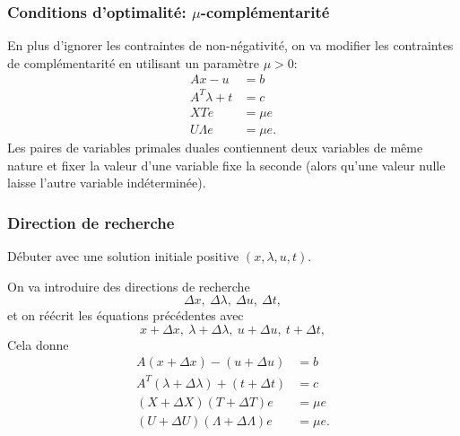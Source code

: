 \documentclass[t, aspectratio=169,usepdftitle=false]{beamer}
\begin{document}
\begin{frame}
\frametitle{Conditions d'optimalité: $\mu$-complémentarité}

En plus d'ignorer les contraintes de non-négativité, on va modifier les contraintes de complémentarité en utilisant un paramètre $\mu > 0$:
\begin{align*}
Ax - u &= b \\
A^T \lambda + t &= c \\
XTe &= \mu e\\
U\Lambda e &= \mu e.
\end{align*}
Les paires de variables primales duales contiennent deux variables de même nature et fixer la valeur d'une variable fixe la seconde (alors qu'une valeur nulle laisse l'autre variable indéterminée).

\end{frame}

\begin{frame}
\frametitle{Direction de recherche}

Débuter avec une solution initiale positive $(x, \lambda, u, t)$.

\mbox{}

On va introduire des directions de recherche
\[
\Delta x,\ \Delta \lambda,\ \Delta u,\ \Delta t,
\]
et on réécrit les équations précédentes avec
\[
x + \Delta x,\ \lambda + \Delta \lambda,\ u + \Delta u,\ t + \Delta t,
\]
Cela donne
\begin{align*}
A(x + \Delta x) - (u + \Delta u) &= b \\
A^T (\lambda + \Delta \lambda) + (t + \Delta t) &= c \\
(X + \Delta X)(T + \Delta T)e &= \mu e\\
(U + \Delta U)(\Lambda + \Delta \Lambda)e &= \mu e.
\end{align*}

\end{frame}
\end{document}
